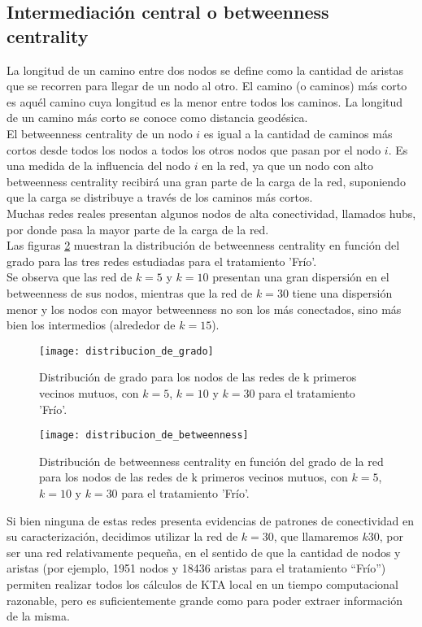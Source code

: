 \subsection*{Intermediación central o betweenness centrality}
La longitud de un camino entre dos nodos se define como la cantidad de aristas que se recorren para llegar de un nodo al otro. El camino (o caminos) más corto es aquél camino cuya longitud es la menor entre todos los caminos. La longitud de un camino más corto se conoce como distancia geodésica.\\
El betweenness centrality de un nodo $i$ es igual a la cantidad de caminos más cortos desde todos los nodos a todos los otros nodos que pasan por el nodo $i$. Es una medida de la influencia del nodo $i$ en la red, ya que un nodo con alto betweenness centrality recibirá una gran parte de la carga de la red, suponiendo que la carga se distribuye a través de los caminos más cortos.\\
Muchas redes reales presentan algunos nodos de alta conectividad, llamados hubs, por donde pasa la mayor parte de la carga de la red.\\
Las figuras \ref{fig:distribucion_de_betweenness} muestran la distribución de betweenness centrality en función del grado para las tres redes estudiadas para el tratamiento 'Frío'.\\
Se observa que las red de $k=5$ y $k=10$ presentan una gran dispersión en el betweenness de sus nodos, mientras que la red de $k=30$ tiene una dispersión menor y los nodos con mayor betweenness no son los más conectados, sino más bien los intermedios (alrededor de $k=15$).\\
\begin{figure}[H]
\centering
\texttt{[image: distribucion\_de\_grado]}
\caption{Distribución de grado para los nodos de las redes de k primeros vecinos mutuos, con $k=5$, $k=10$ y $k=30$ para el tratamiento 'Frío'.}
\label{fig:distribucion_de_grado}
\end{figure}
\begin{figure}[H]
\centering
\texttt{[image: distribucion\_de\_betweenness]}
\caption{Distribución de betweenness centrality en función del grado de la red para los nodos de las redes de k primeros vecinos mutuos, con $k=5$, $k=10$ y $k=30$ para el tratamiento 'Frío'.}
\label{fig:distribucion_de_betweenness}
\end{figure}
Si bien ninguna de estas redes presenta evidencias de patrones de conectividad en su caracterización, decidimos utilizar la red de $k=30$, que llamaremos $k30$, por ser una red relativamente pequeña, en el sentido de que la cantidad de nodos y aristas (por ejemplo, 1951 nodos y 18436 aristas para el tratamiento ``Frío'') permiten realizar todos los cálculos de KTA local en un tiempo computacional razonable, pero es suficientemente grande como para poder extraer información de la misma.
